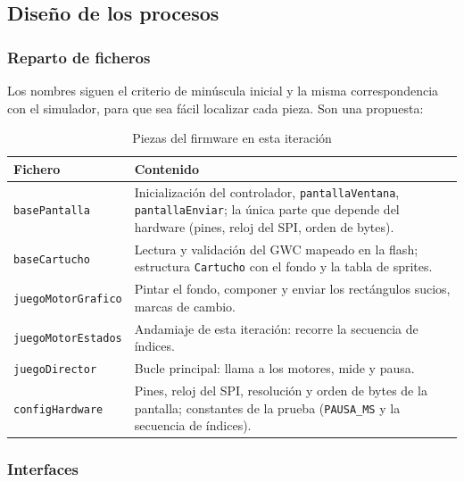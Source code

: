 \subsection{Diseño de los procesos}
\label{sec:F6I92Diseno}

\subsubsection{Reparto de ficheros}

Los nombres siguen el criterio de minúscula inicial y la misma correspondencia con el simulador, para que sea fácil localizar cada pieza. Son una propuesta:

\begin{table}[H]
	\centering
	\begin{tabular}{lp{8.5cm}}
		\toprule
		Fichero & Contenido \\
		\midrule
		\texttt{basePantalla} & Inicialización del controlador, \texttt{pantallaVentana}, \texttt{pantallaEnviar}; la única parte que depende del hardware (pines, reloj del SPI, orden de bytes). \\
		\texttt{baseCartucho} & Lectura y validación del GWC mapeado en la flash; estructura \texttt{Cartucho} con el fondo y la tabla de sprites. \\
		\texttt{juegoMotorGrafico} & Pintar el fondo, componer y enviar los rectángulos sucios, marcas de cambio. \\
		\texttt{juegoMotorEstados} & Andamiaje de esta iteración: recorre la secuencia de índices. \\
		\texttt{juegoDirector} & Bucle principal: llama a los motores, mide y pausa. \\
		\texttt{configHardware} & Pines, reloj del SPI, resolución y orden de bytes de la pantalla; constantes de la prueba (\texttt{PAUSA\_MS} y la secuencia de índices). \\
		\bottomrule
	\end{tabular}
	\caption{Piezas del firmware en esta iteración}
	\label{tab:F6I92Ficheros}
\end{table}

\subsubsection{Interfaces}

